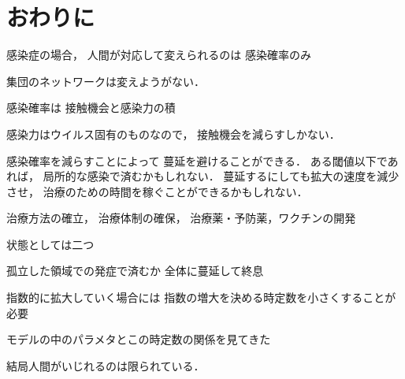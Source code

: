 \documentclass[10pt,oneside]{scrartcl}
\begin{document}
\section{おわりに}
\label{sec:org08c490f}

感染症の場合，
人間が対応して変えられるのは
感染確率のみ

集団のネットワークは変えようがない．

感染確率は
接触機会と感染力の積

感染力はウイルス固有のものなので，
接触機会を減らすしかない．

感染確率を減らすことによって
蔓延を避けることができる．
ある閾値以下であれば，
局所的な感染で済むかもしれない．
蔓延するにしても拡大の速度を減少させ，
治療のための時間を稼ぐことができるかもしれない．

治療方法の確立，
治療体制の確保，
治療薬・予防薬，ワクチンの開発

状態としては二つ

孤立した領域での発症で済むか
全体に蔓延して終息

指数的に拡大していく場合には
指数の増大を決める時定数を小さくすることが必要

モデルの中のパラメタとこの時定数の関係を見てきた

結局人間がいじれるのは限られている．
\end{document}
